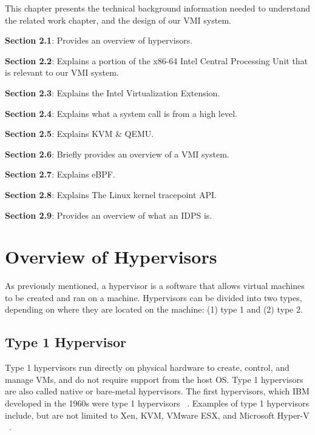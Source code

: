 \documentclass{report}
\begin{document}
\begin{spacing}{1.5}
{\large
This chapter presents the technical background information needed to understand the related work chapter, and the design of our VMI system.
\newline
}


\begin{itemize}
{\large
\item \textbf{Section 2.1}: Provides an overview of hypervisors. 
\item \textbf{Section 2.2}: Explains a portion of the x86-64 Intel Central Processing Unit that is relevant to our VMI system. 
\item \textbf{Section 2.3}: Explains the Intel Virtualization Extension. 
\item \textbf{Section 2.4}: Explains what a system call is from a high level. 
\item \textbf{Section 2.5}: Explains KVM \& QEMU. 
\item \textbf{Section 2.6}: Briefly provides an overview of a VMI system.
\item \textbf{Section 2.7}: Explains eBPF.
\item \textbf{Section 2.8}: Explains The Linux kernel tracepoint API.
\item \textbf{Section 2.9}: Provides an overview of what an IDPS is. 
\newline
}
\end{itemize}








\section{Overview of Hypervisors}

{\large
As previously mentioned, a hypervisor is a software that allows virtual machines to be created and ran on a machine. Hypervisors can be divided into two types, depending on where they are located on the machine: (1) type 1 and (2) type 2.
\newline
}

\subsection{Type 1 Hypervisor}

{\large
Type 1 hypervisors run directly on physical hardware to create, control, and manage VMs, and do not require support from the host OS. Type 1 hypervisors are also called native or bare-metal hypervisors. The first hypervisors, which IBM developed in the 1960s were type 1 hypervisors ~\cite{meier2008ibm}. Examples of type 1 hypervisors include, but are not limited to Xen, KVM, VMware ESX, and Microsoft Hyper-V ~\cite{bauman2015survey}.
\newline
}



\end{spacing}
\end{document}

